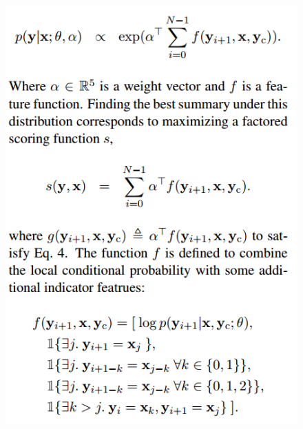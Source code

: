 \documentclass[xcolor={table}]{beamer}
\begin{document}
\begin{frame}{\cite{rush2015neural}}
\begin{figure}[h]
\begin{columns}
\begin{column}{.48\textwidth}
\includegraphics[scale=.3]{images/disc-rush15} \\
\end{column}
\end{columns}
\end{figure}
\end{frame}
\end{document}
